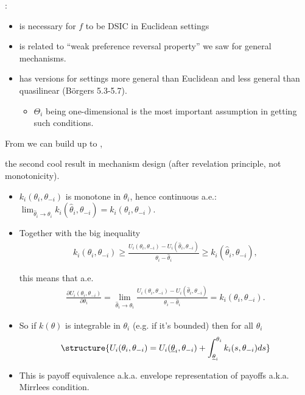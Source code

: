 \documentclass[english,handout,10pt]{beamer}		%
\def\lyxframeend{} %
\begin{document}
:
\begin{itemize}
	\item is necessary for $f$ to be DSIC in Euclidean settings
	\item is related to ``weak preference reversal property'' we saw for general mechanisms.
	\item has versions for settings more general than Euclidean and less general than quasilinear (B{\"o}rgers 5.3-5.7).
	\begin{itemize}
		\item $\Theta_i$ being one-dimensional is the most important assumption in getting such conditions.
	\end{itemize}
\end{itemize}
From  we can build up to , 

the second cool result in mechanism design (after revelation principle, not monotonicity).
\lyxframeend


\begin{itemize}
	\item $k_i(\theta_i,\theta_{-i})$ is monotone in $\theta_i$, hence continuous a.e.: $\lim_{\hat{\theta}_i \to \theta_i} k_i(\hat{\theta}_i,\theta_{-i}) = k_i(\theta_i,\theta_{-i})$.
	\pause
	\item Together with the big inequality 
	{\begin{align*}
		k_i(\theta_i,\theta_{-i})
		\geq 
		\frac{ U_i(\theta_i, \theta_{-i}) - U_i(\hat{\theta}_i, \theta_{-i}) }{ \theta_i - \hat{\theta}_i } 
		\geq 
		k_i(\hat{\theta}_i,\theta_{-i}),
	\end{align*}}
	
	this means that a.e.
	\pause
	\begin{align*}
		\frac{\partial U_i(\theta_i,\theta_{-i})}{\partial \theta_i} = \lim_{\hat{\theta}_i \to \theta_i} \frac{ U_i(\theta_i, \theta_{-i}) - U_i(\hat{\theta}_i, \theta_{-i}) }{ \theta_i - \hat{\theta}_i }  = k_i(\theta_i,\theta_{-i}).
	\end{align*}
\end{itemize}
\lyxframeend


\begin{itemize}
	\item So if $k(\theta)$ is integrable in $\theta_i$ (e.g. if it's bounded) then for all $\theta_i$
	\begin{align*}
		\structure{
		U_i(\theta_i, \theta_{-i}) = U_i (\underline{\theta}_i,\theta_{-i}) + \int_{\underline{\theta}_i}^{\theta_i} k_i(s,\theta_{-i}) d s
		}
	\end{align*}
	\item This is \alert{payoff equivalence} a.k.a. envelope representation of payoffs a.k.a. Mirrlees condition.
\end{itemize}
\lyxframeend
\end{document}
